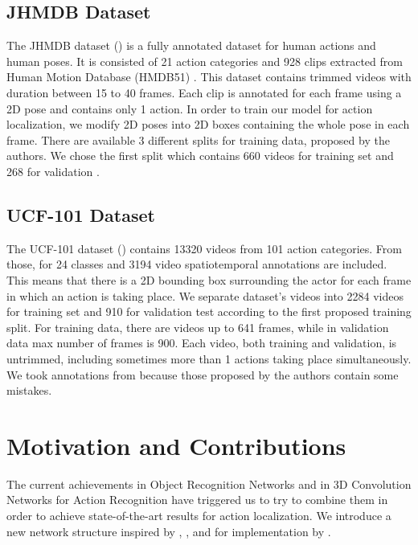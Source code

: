 \subsection{JHMDB Dataset}
The JHMDB dataset (\cite{Jhuang:ICCV:2013}) is a fully annotated dataset for human actions and human poses. It is consisted of 21 action categories and 928
clips extracted from Human Motion Database (HMDB51) \cite{Kuehne11}. This dataset contains trimmed videos with duration between
15 to 40 frames. Each clip is annotated for each frame using a 2D pose and contains only 1 action.
In order to train our model for action localization, we modify 2D poses into 2D boxes containing the whole pose in each frame.
There are available 3 different splits for training data, proposed by the authors. We chose the first split which contains 660
videos for training set and 268 for validation . 

\subsection{UCF-101 Dataset}
The UCF-101 dataset (\cite{soomro2012ucf101}) contains 13320 videos from 101 action categories.
From those, for 24 classes and 3194 video spatiotemporal annotations are included. This means that there is a 2D bounding box surrounding the actor for each frame in which an action is taking place.
We separate dataset's videos into 2284 videos for training set and 910 for validation test according to the
first proposed training split. For training data, there are videos up to 641 frames, while in validation data max number of frames is 900.
Each video, both training and validation, is untrimmed, including sometimes more than 1 actions taking place simultaneously.
We took annotations from \cite{singh2016online} because those  proposed by the authors contain some mistakes.

\section{Motivation and Contributions}
The current achievements in Object Recognition Networks and in 3D Convolution Networks for Action Recognition have triggered us to try
to combine them in order to achieve state-of-the-art results for action localization. We introduce a new network structure inspired by
\cite{DBLP:journals/corr/HouCS17}, \cite{DBLP:journals/corr/abs-1712-09184},\cite{Ren:2015:FRT:2969239.2969250} and for implementation
by \cite{jjfaster2rcnn}.

